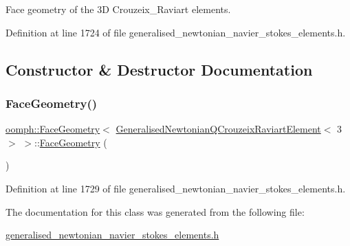 Face geometry of the 3D Crouzeix\+\_\+\+Raviart elements. 

Definition at line 1724 of file generalised\+\_\+newtonian\+\_\+navier\+\_\+stokes\+\_\+elements.\+h.



\subsection{Constructor \& Destructor Documentation}
\mbox{\label{classoomph_1_1FaceGeometry_3_01GeneralisedNewtonianQCrouzeixRaviartElement_3_013_01_4_01_4_a19734ae37637b47859106c3256a24323}} 
\subsubsection{\texorpdfstring{Face\+Geometry()}{FaceGeometry()}}
{\footnotesize\ttfamily \hyperlink{classoomph_1_1FaceGeometry}{oomph\+::\+Face\+Geometry}$<$ \hyperlink{classoomph_1_1GeneralisedNewtonianQCrouzeixRaviartElement}{Generalised\+Newtonian\+Q\+Crouzeix\+Raviart\+Element}$<$ 3 $>$ $>$\+::\hyperlink{classoomph_1_1FaceGeometry}{Face\+Geometry} (\begin{DoxyParamCaption}{ }\end{DoxyParamCaption})\hspace{0.3cm}{\ttfamily [inline]}}



Definition at line 1729 of file generalised\+\_\+newtonian\+\_\+navier\+\_\+stokes\+\_\+elements.\+h.



The documentation for this class was generated from the following file\+:\begin{DoxyCompactItemize}
\item 
\hyperlink{generalised__newtonian__navier__stokes__elements_8h}{generalised\+\_\+newtonian\+\_\+navier\+\_\+stokes\+\_\+elements.\+h}\end{DoxyCompactItemize}
